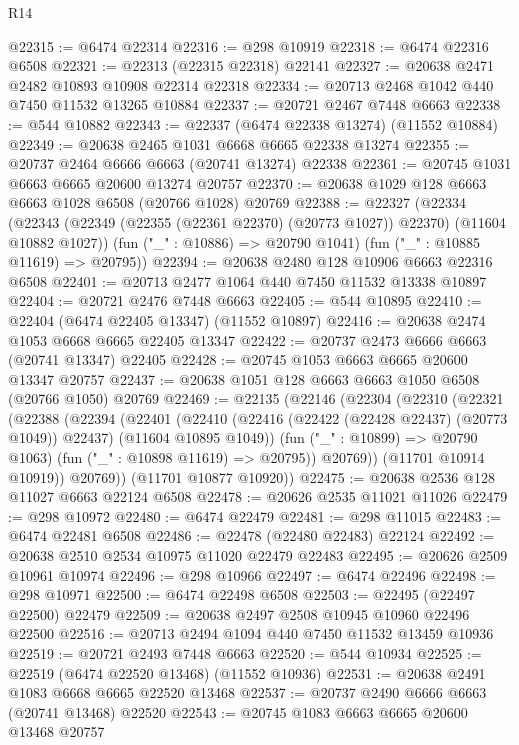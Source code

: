 \begin{lexlean}{R14}
\begin{coremodule}
{{{{{{{{{{{{{{{{{{{{{{{{{{{{{{{{{{{{{{{{{{{{{{{{{{{{{{{{{{{{{{{{{{{{{{{{{{{{{{{{{{@22315 := @6474 @22314
@22316 := @298 @10919
@22318 := @6474 @22316 @6508
@22321 := @22313 (@22315 @22318) @22141
@22327 := @20638 @2471 @2482 @10893 @10908 @22314 @22318
@22334 := @20713 @2468 @1042 @440 @7450 @11532 @13265 @10884
@22337 := @20721 @2467 @7448 @6663
@22338 := @544 @10882
@22343 := @22337 (@6474 @22338 @13274) (@11552 @10884)
@22349 := @20638 @2465 @1031 @6668 @6665 @22338 @13274
@22355 := @20737 @2464 @6666 @6663 (@20741 @13274) @22338
@22361 := @20745 @1031 @6663 @6665 @20600 @13274 @20757
@22370 := @20638 @1029 @128 @6663 @6663 @1028 @6508 (@20766 @1028) @20769
@22388 := @22327
    (@22334
      (@22343 (@22349 (@22355 (@22361 @22370) (@20773 @1027)) @22370) (@11604 @10882 @1027))
      (fun ("_" : @10886) => @20790 @1041)
      (fun ("_" : @10885 @11619) => @20795))
@22394 := @20638 @2480 @128 @10906 @6663 @22316 @6508
@22401 := @20713 @2477 @1064 @440 @7450 @11532 @13338 @10897
@22404 := @20721 @2476 @7448 @6663
@22405 := @544 @10895
@22410 := @22404 (@6474 @22405 @13347) (@11552 @10897)
@22416 := @20638 @2474 @1053 @6668 @6665 @22405 @13347
@22422 := @20737 @2473 @6666 @6663 (@20741 @13347) @22405
@22428 := @20745 @1053 @6663 @6665 @20600 @13347 @20757
@22437 := @20638 @1051 @128 @6663 @6663 @1050 @6508 (@20766 @1050) @20769
@22469 := @22135
    (@22146
      (@22304
        (@22310
          (@22321
            (@22388
              (@22394
                (@22401
                  (@22410
                    (@22416 (@22422 (@22428 @22437) (@20773 @1049)) @22437)
                    (@11604 @10895 @1049))
                  (fun ("_" : @10899) => @20790 @1063)
                  (fun ("_" : @10898 @11619) => @20795))
                @20769))
            (@11701 @10914 @10919))
          @20769))
      (@11701 @10877 @10920))
@22475 := @20638 @2536 @128 @11027 @6663 @22124 @6508
@22478 := @20626 @2535 @11021 @11026
@22479 := @298 @10972
@22480 := @6474 @22479
@22481 := @298 @11015
@22483 := @6474 @22481 @6508
@22486 := @22478 (@22480 @22483) @22124
@22492 := @20638 @2510 @2534 @10975 @11020 @22479 @22483
@22495 := @20626 @2509 @10961 @10974
@22496 := @298 @10966
@22497 := @6474 @22496
@22498 := @298 @10971
@22500 := @6474 @22498 @6508
@22503 := @22495 (@22497 @22500) @22479
@22509 := @20638 @2497 @2508 @10945 @10960 @22496 @22500
@22516 := @20713 @2494 @1094 @440 @7450 @11532 @13459 @10936
@22519 := @20721 @2493 @7448 @6663
@22520 := @544 @10934
@22525 := @22519 (@6474 @22520 @13468) (@11552 @10936)
@22531 := @20638 @2491 @1083 @6668 @6665 @22520 @13468
@22537 := @20737 @2490 @6666 @6663 (@20741 @13468) @22520
@22543 := @20745 @1083 @6663 @6665 @20600 @13468 @20757
}}}}}}}}}}}}}}}}}}}}}}}}}}}}}}}}}}}}}}}}}}}}}}}}}}}}}}}}}}}}}}}}}}}}}}}}}}}}}}}}}}
\end{coremodule}
\end{lexlean}
